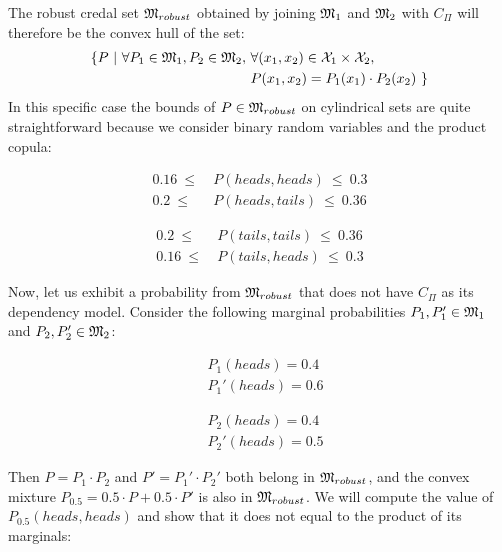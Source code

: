 \begin{example}
The robust credal set $\mathfrak{M}_{robust}$ obtained by joining $\mathfrak{M}_1$ and $\mathfrak{M}_2$ with $C_\Pi$ will therefore be the convex hull of the set:
\begin{align*}
    \{P~|~\forall P_1\in\mathfrak{M}_1, P_2\in\mathfrak{M}_2,~&\forall (x_1,x_2)\in\mathcal{X}_1\times\mathcal{X}_2,\\
    ~&P(x_1, x_2) = P_1(x_1)\cdot P_2(x_2)~\}
\end{align*}
In this specific case the bounds of $P\in\mathfrak{M}_{robust}$ on cylindrical sets are quite straightforward because we consider binary random variables and the product copula:\newline\medskip
\begin{minipage}{0.5\linewidth}
\begin{align*}
    0.16 ~\leqslant~ &P(heads, heads) ~\leqslant~ 0.3 \\
    0.2 ~\leqslant~ &P(heads, tails) ~\leqslant~ 0.36
\end{align*}
\end{minipage}
\begin{minipage}{0.5\linewidth}
\begin{align*}
    0.2 ~\leqslant~ &P(tails, tails) ~\leqslant~ 0.36 \\
    0.16 ~\leqslant~ &P(tails, heads) ~\leqslant~ 0.3
\end{align*}
\end{minipage}\bigskip\newline
Now, let us exhibit a probability from $\mathfrak{M}_{robust}$ that does not have $C_\Pi$ as its dependency model. Consider the following marginal probabilities $P_1,P_1'\in\mathfrak{M}_1$ and $P_2,P_2'\in\mathfrak{M}_2$:\newline\medskip
\begin{minipage}{0.5\linewidth}
\begin{align*}
    &P_1(heads)=0.4 \\
    &P_1'(heads)=0.6
\end{align*}
\end{minipage}
\begin{minipage}{0.5\linewidth}
\begin{align*}
    &P_2(heads)=0.4 \\
    &P_2'(heads)=0.5
\end{align*}
\end{minipage}\bigskip\newline
Then $P=P_1\cdot P_2$ and $P'=P_1'\cdot P_2'$ both belong in $\mathfrak{M}_{robust}$, and the convex mixture $P_{0.5}=0.5\cdot P+0.5\cdot P'$ is also in $\mathfrak{M}_{robust}$.
We will compute the value of $P_{0.5}(heads, heads)$ and show that it does not equal to the product of its marginals:

\end{example}
